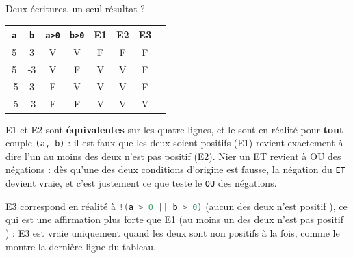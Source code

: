 \begin{UPSTIprofOnlyEnv}
    \begin{UPSTIcorrectionP}{Deux écritures, un seul résultat ?}
        \begin{center}
            \begin{tabular}{|c|c|c|c|c|c|c|c|}
                \hline
                \texttt{a} & \texttt{b} & \texttt{a>0} & \texttt{b>0} & E1 & E2 & E3 \\
                \hline
                5          & 3          & V            & V            & F  & F  & F  \\
                \hline
                5          & -3         & V            & F            & V  & V  & F  \\
                \hline
                -5         & 3          & F            & V            & V  & V  & F  \\
                \hline
                -5         & -3         & F            & F            & V  & V  & V  \\
                \hline
            \end{tabular}
        \end{center}

        E1 et E2 sont \textbf{équivalentes} sur les quatre lignes, et le sont en réalité pour \textbf{tout} couple \texttt{(a, b)} : \og il est faux que les deux soient positifs \fg{} (E1) revient exactement à dire \og l'un au moins des deux n'est pas positif \fg{} (E2). Nier un \og ET \fg{} revient à \og OU \fg{} des négations : dès qu'une des deux conditions d'origine est fausse, la négation du \texttt{ET} devient vraie, et c'est justement ce que teste le \texttt{OU} des négations.

        E3 correspond en réalité à \lstinline[language=C]{!(a > 0 || b > 0)} (\og aucun des deux n'est positif \fg), ce qui est une affirmation plus forte que E1 (\og au moins un des deux n'est pas positif \fg) : E3 est vraie uniquement quand les deux sont non positifs à la fois, comme le montre la dernière ligne du tableau.
    \end{UPSTIcorrectionP}
\end{UPSTIprofOnlyEnv}


